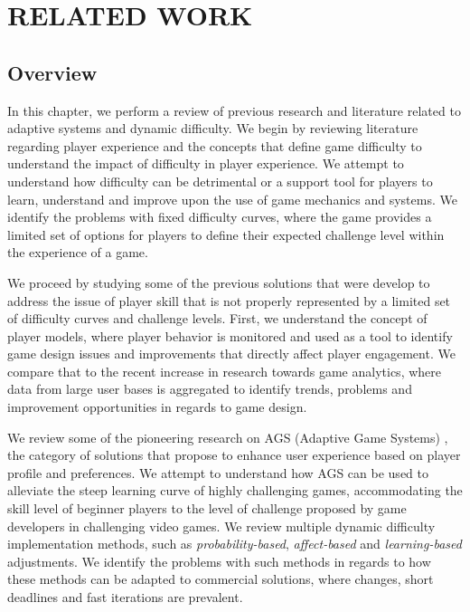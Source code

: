 \chapter{RELATED WORK}
\label{ch:related-work}



\section{Overview}

In this chapter, we perform a review of previous research and literature related to adaptive systems and dynamic difficulty. We begin by reviewing literature regarding player experience and the concepts that define game difficulty to understand the impact of difficulty in player experience. We attempt to understand how difficulty can be detrimental or a support tool for players to learn, understand and improve upon the use of game mechanics and systems. We identify the problems with fixed difficulty curves, where the game provides a limited set of options for players to define their expected challenge level within the experience of a game. 

We proceed by studying some of the previous solutions that were develop to address the issue of player skill that is not properly represented by a limited set of difficulty curves and challenge levels. First, we understand the concept of player models, where player behavior is monitored and used as a tool to identify game design issues and improvements that directly affect player engagement. We compare that to the recent increase in research towards game analytics, where data from large user bases is aggregated to identify trends, problems and improvement opportunities in regards to game design.

We review some of the pioneering research on AGS (Adaptive Game Systems) \cite{ARTICLE_PlayerCentredGameDesign}, the category of solutions that propose to enhance user experience based on player profile and preferences. We attempt to understand how AGS can be used to alleviate the steep learning curve of highly challenging games, accommodating the skill level of beginner players to the level of challenge proposed by game developers in challenging video games. We review multiple dynamic difficulty implementation methods, such as \emph{probability-based}, \emph{affect-based} and \emph{learning-based} adjustments. We identify the problems with such methods in regards to how these methods can be adapted to commercial solutions, where changes, short deadlines and fast iterations are prevalent.

